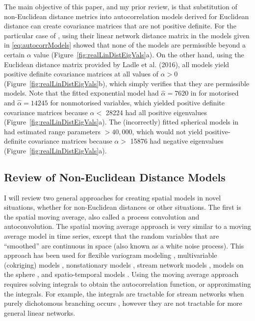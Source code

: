 \documentclass[11pt, titlepage]{article}\usepackage[]{graphicx}\usepackage[]{color}
\begin{document}
\begin{spacing}{1.9}
\begin{flushleft}
The main objective of this paper, and my prior review, is that substitution of non-Euclidean distance metrics into autocorrelation models derived for Euclidean distance can create covariance matrices that are not positive definite. For the particular case of \citet{Ladl:Avga:Whea:Boyc:pred:2016}, using their linear network distance matrix in the models given in \ref{eq:autocorrModels} showed that none of the models are permissible beyond a certain $\alpha$ value (Figure~\ref{fig:realLinDistEigVals}a).  On the other hand, using the Euclidean distance matrix provided by Ladle et al. (2016), all models yield positive definite covariance matrices at all values of $\alpha > 0$ (Figure~\ref{fig:realLinDistEigVals}b), which simply verifies that they are permissible models.  Note that the fitted exponential model had $\hat{\alpha} = 7620$ in \citet{Ladl:Avga:Whea:Boyc:pred:2016} for motorised and $\hat{\alpha} = 14245$ for nonmotorised variables, which yielded positive definite covariance matrices because $\alpha <$ 28224 had all positive eigenvalues (Figure~\ref{fig:realLinDistEigVals}a). The (incorrectly) fitted spherical models in \citet{Ladl:Avga:Whea:Boyc:pred:2016} had estimated range parameters $>40,000$, which would not yield positive-definite covariance matrices because $\alpha >$ 15876 had negative eigenvalues (Figure~\ref{fig:realLinDistEigVals}a).

\subsection*{Review of Non-Euclidean Distance Models}

I will review two general approaches for creating spatial models in novel situations, whether for non-Euclidean distances or other situations.  The first is the spatial moving average, also called a process convolution and autoconvolution.  The spatial moving average approach is very similar to a moving average model in time series, except that the random variables that are ``smoothed'' are continuous in space (also known as a white noise process).  This approach has been used for flexible variogram modeling \citep{Barr:Ver:blac:1996}, multivariable (cokriging) models \citep{Ver:Barr:cons:1998,Ver:Cres:Barr:flex:2004}, nonstationary models \citep{Higd:proc:1998,Higd:Swal:Kern:non-:1999}, stream network models \citep{Ver:Pete:Theo:spat:2006, Cres:Frey:Harc:Smit:spat:2006, Ver:Pete:Move:2010}, models on the sphere \citep{Gnei:stri:2013}, and spatio-temporal models \citep{Wikl:kern:2002,Conn:John:Ver:spat:2015}. Using the moving average approach requires solving integrals to obtain the autocorrelation function, or approximating the integrals. For example, the integrals are tractable for stream networks when purely dichotomous branching occurs \citep{Ver:Pete:Theo:spat:2006}, however they are not tractable for more general linear networks. 


\end{flushleft}
\end{spacing}
\end{document}

